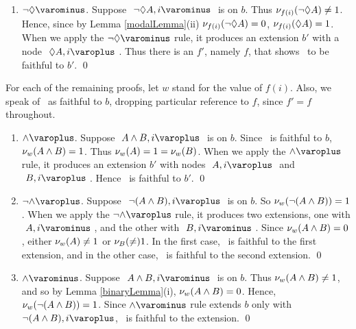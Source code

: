 \begin{proof*}
\begin{enumerate}
		\item $\uRule{ \neg\Diam }$. Suppose $ \like{ \uNode{ \neg \Diam A }{ i }} $ is on $ b $.
							Thus $ \mathcal{\nu}_{ f(i) }({ \neg \Diamond A }) \neq 1 $.
							Hence, since by Lemma \ref{modalLemma}(ii) $ \mathcal{\nu}_{ f(i) }({ \neg \Diamond A }) = 0 $, $ \mathcal{\nu}_{ f(i) }({ \Diamond A }) = 1 $.
							When we apply the $ \uRule{ \neg \Diam } $ rule, it produces an extension $ b' $ with a node $ \like{ \dNode{ \Diam A }{ i }} $.
							Thus there is an $ f' $, namely $ f $, that shows \Model\ to be faithful to $ b' $.  
							\qed
							
		
		\setcounter{enumi_saved}{\value{enumi}}

	\end{enumerate}

\noindent For each of the remaining proofs, let $w$ stand for the value of $f(i)$. Also, we speak of \Model\ as faithful to $ b $, dropping particular reference to $ f $, since $ f' = f $ throughout.

	\begin{enumerate}
		\setcounter{enumi}{\value{enumi_saved}}


		\item $\dRule{ \wedge }$. 	Suppose $ \like{ \dNode{ A \wedge B }{ i } } $ is on $ b $.
							Since \Model\ is faithful to $ b $, $ \mathcal{\nu}_{ w }({ A \wedge B }) = 1 $.
							Thus $ \mathcal{\nu}_{ w }({ A }) = 1 = \mathcal{\nu}_{ w }({ B }) $.
							When we apply the $ \dRule{ \wedge } $ rule,
								it produces an extension $ b' $ with nodes $ \like{ \dNode{ A }{ i }} $ and $ \like{ \dNode{ B }{ i }} $.
							Hence \Model\ is faithful to $ b' $.
							\qed

		\item $\dRule{ \neg\wedge }$. Suppose $ \like{ \dNode{ \neg (A \wedge B) }{ i } } $ is on $ b $.
							So $ \mathcal{\nu}_{ w }({ \neg (A \wedge B) }) = 1 $.	
							When we apply the $ \dRule{ \neg \wedge } $ rule, it produces two extensions, 
							one with $ \like{\uNode{ A }{ i }} $, and the other with $ \like{ \uNode{ B }{ i } } $.
							Since $ \mathcal{\nu}_{ w }({ A \wedge B }) = 0 $, either $ \mathcal{\nu}_{ w }({ A }) \neq 1 $ or $ \mathcal{\nu}_{ B }({\neq}) 1 $.
							In the first case, \Model\ is faithful to the first extension, and in the other case, \Model\ is faithful to the second extension.
							\qed

		\item $\uRule{ \wedge }$. 	Suppose $ \like{ \uNode{ A \wedge B }{ i } } $ is on $ b $.
							Thus $ \mathcal{\nu}_{ w }({ A \wedge B }) \neq 1 $, and so by Lemma \ref{binaryLemma}(i), $ \mathcal{\nu}_{ w }({ A \wedge B }) = 0$.
							Hence, $ \mathcal{\nu}_{ w }({ \neg (A \wedge B) }) = 1 $.
							Since $ \uRule{ \wedge } $ rule extends $ b $ only with $ \dNode{ \neg (A \wedge B ) }{ i }$,
							\Model\ is faithful to the extension.
							\qed


\end{enumerate}
\end{proof*}
